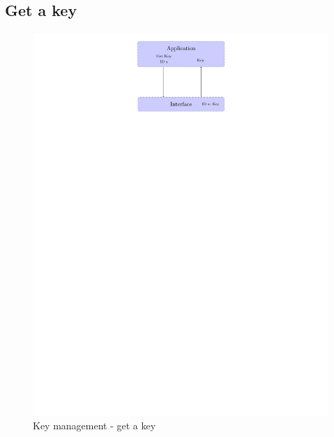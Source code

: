 \subsection*{Get a key}
\begin{figure}[!ht]
\centering
\includegraphics[trim=12cm 22cm 9.5cm 0cm]{figures/key_manag_get_key.pdf}
\caption{Key management - get a key\newline}
\label{fig:gci_key_mng_get}
\end{figure}
\newpage

